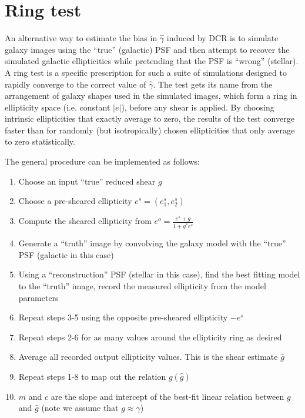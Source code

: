\documentclass[apj]{emulateapj}
\begin{document}
\section{Ring test}\label{sec:ringtest}
An alternative way to estimate the bias in $\hat{\gamma}$ induced by
DCR is to simulate galaxy images using the ``true'' (galactic) PSF and
then attempt to recover the simulated galactic ellipticities while
pretending that the PSF is ``wrong'' (stellar).  A ring test
\citep{Nakajima2007} is a specific prescription for such a suite of
simulations designed to rapidly converge to the correct value of
$\hat{\gamma}$.  The test gets its name from the arrangement of galaxy
shapes used in the simulated images, which form a ring in ellipticity
space (i.e. constant $|e|$), before any shear is applied.  By choosing
intrinsic ellipticities that exactly average to zero, the results of
the test converge faster than for randomly (but isotropically) chosen
ellipticities that only average to zero statistically.

The general procedure can be implemented as follows:

\begin{enumerate}
  \item Choose an input ``true'' reduced shear $g$
  \item Choose a pre-sheared ellipticity $e^s = (e_1^s, e_2^s)$
  \item Compute the sheared ellipticity from $e^o = \frac{e^s+g}{1+g^*e^s}$
  \item Generate a ``truth'' image by convolving the galaxy model with
    the ``true'' PSF (galactic in this case)
  \item Using a ``reconstruction'' PSF (stellar in this case), find
    the best fitting model to the ``truth'' image, record the measured
    ellipticity from the model parameters
  \item Repeat steps 3-5 using the opposite pre-sheared ellipticity
    $-e^s$
  \item Repeat steps 2-6 for as many values around the ellipticity
    ring as desired
  \item Average all recorded output ellipticity values.  This is the
    shear estimate $\hat{g}$
  \item Repeat steps 1-8 to map out the relation $g(\hat{g})$
  \item $m$ and $c$ are the slope and intercept of the best-fit linear
    relation between $g$ and $\hat{g}$ (note we assume that $g \approx
    \gamma$)
\end{enumerate}
\end{document}
